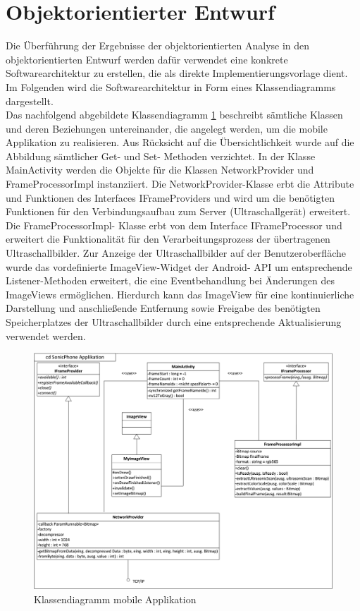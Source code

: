 \section{Objektorientierter Entwurf}
Die Überführung der Ergebnisse der objektorientierten Analyse in den  objektorientierten Entwurf werden dafür verwendet eine konkrete Softwarearchitektur zu erstellen, die als direkte Implementierungsvorlage dient. Im Folgenden wird die Softwarearchitektur in Form eines Klassendiagramms dargestellt. \\
Das nachfolgend abgebildete Klassendiagramm \ref{fig:cd_mobileApplikation} beschreibt sämtliche Klassen und deren Beziehungen untereinander, die angelegt werden, um die mobile Applikation zu realisieren. Aus Rücksicht auf die Übersichtlichkeit wurde auf die Abbildung sämtlicher Get- und Set- Methoden verzichtet. In der Klasse MainActivity werden die Objekte für die Klassen NetworkProvider und FrameProcessorImpl instanziiert. Die NetworkProvider-Klasse erbt die Attribute und Funktionen des Interfaces IFrameProviders und wird um die benötigten Funktionen für den Verbindungsaufbau zum Server (Ultraschallgerät) erweitert. Die FrameProcessorImpl- Klasse erbt von dem Interface IFrameProcessor und erweitert die Funktionalität für den Verarbeitungsprozess der übertragenen Ultraschallbilder. Zur Anzeige der Ultraschallbilder auf der Benutzeroberfläche wurde das vordefinierte ImageView-Widget der Android- API um entsprechende Listener-Methoden erweitert, die eine Eventbehandlung bei Änderungen des ImageViews ermöglichen. Hierdurch kann das ImageView  für eine kontinuierliche Darstellung und anschließende Entfernung sowie Freigabe des benötigten Speicherplatzes der Ultraschallbilder durch eine entsprechende Aktualisierung verwendet werden.  

\begin{figure}[H] 
\centering
\includegraphics[width=1\textwidth]{Bilder/objektorientierteAnalyseundEntwurf/cd_mobileApplikation}
\caption{{\small Klassendiagramm mobile Applikation}}
\label{fig:cd_mobileApplikation}
\end{figure}
